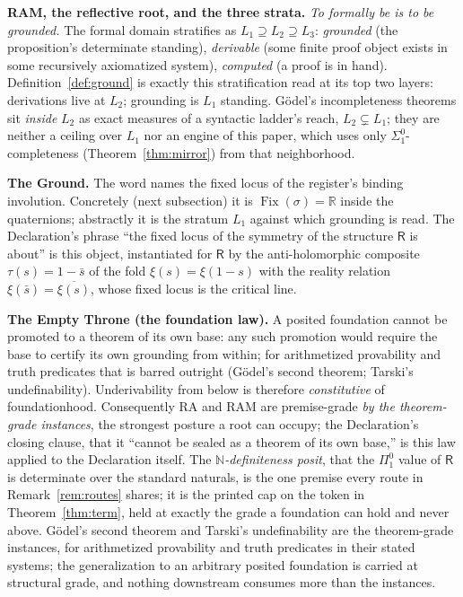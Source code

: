 \documentclass[twocolumn,10pt]{article}
\theoremstyle{plain}
\theoremstyle{definition}
\newcommand{\R}{\mathsf{R}}
\newcommand{\N}{\mathbb{N}}
\newcommand{\Rl}{\mathbb{R}}
\begin{document}
\textbf{RAM, the reflective root, and the three strata.} \emph{To formally be is to be grounded.} The formal domain stratifies as $L_1\supseteq L_2\supseteq L_3$: \emph{grounded} (the proposition's determinate standing), \emph{derivable} (some finite proof object exists in some recursively axiomatized system), \emph{computed} (a proof is in hand). Definition~\ref{def:ground} is exactly this stratification read at its top two layers: derivations live at $L_2$; grounding is $L_1$ standing. G\"odel's incompleteness theorems sit \emph{inside} $L_2$ as exact measures of a syntactic ladder's reach, $L_2\subsetneq L_1$; they are neither a ceiling over $L_1$ nor an engine of this paper, which uses only $\Sigma^0_1$-completeness (Theorem~\ref{thm:mirror}) from that neighborhood.

\textbf{The Ground.} The word names the fixed locus of the register's binding involution. Concretely (next subsection) it is $\operatorname{Fix}(\sigma)=\Rl$ inside the quaternions; abstractly it is the stratum $L_1$ against which grounding is read. The Declaration's phrase ``the fixed locus of the symmetry of the structure $\R$ is about'' is this object, instantiated for $\R$ by the anti-holomorphic composite $\tau(s)=1-\bar s$ of the fold $\xi(s)=\xi(1-s)$ with the reality relation $\xi(\bar s)=\overline{\xi(s)}$, whose fixed locus is the critical line.

\textbf{The Empty Throne (the foundation law).} A posited foundation cannot be promoted to a theorem of its own base: any such promotion would require the base to certify its own grounding from within; for arithmetized provability and truth predicates that is barred outright (G\"odel's second theorem; Tarski's undefinability). Underivability from below is therefore \emph{constitutive} of foundationhood. Consequently RA and RAM are premise-grade \emph{by the theorem-grade instances}, the strongest posture a root can occupy; the Declaration's closing clause, that it ``cannot be sealed as a theorem of its own base,'' is this law applied to the Declaration itself. The \emph{$\N$-definiteness posit}, that the $\Pi^0_1$ value of $\R$ is determinate over the standard naturals, is the one premise every route in Remark~\ref{rem:routes} shares; it is the printed cap on the token in Theorem~\ref{thm:term}, held at exactly the grade a foundation can hold and never above. G\"odel's second theorem and Tarski's undefinability are the theorem-grade instances, for arithmetized provability and truth predicates in their stated systems; the generalization to an arbitrary posited foundation is carried at structural grade, and nothing downstream consumes more than the instances.
\end{document}
